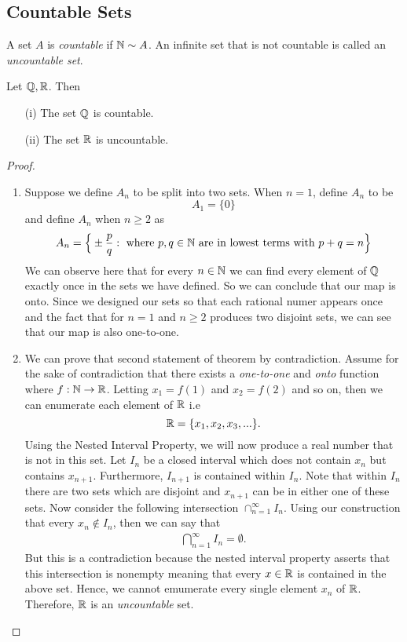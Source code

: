 \subsection{Countable Sets}

\begin{definition}
A set \( A \) is \textit{countable} if \( \mathbb{N} \sim A \). An infinite set that is not countable is called an \textit{uncountable set}.
\end{definition}

\begin{theorem}
Let \( \mathbb{Q}, \mathbb{R} \). Then 
\begin{enumerate}
    \item[(i)] The set \( \mathbb{Q} \) is countable. 
    \item[(ii)] The set \( \mathbb{R} \) is uncountable.
\end{enumerate}


\end{theorem} 


\begin{proof}
\begin{enumerate}
\item Suppose we define \( A_n \) to be split into two sets. When \( n = 1 \), define \( A_n \) to be 
\[ A_1 = \{  0 \}\] and define \( A_n \) when \( n \geq 2 \) as 
\[ A_n =   \Big\{ \pm \frac{p}{q} : \text{ where } p,q \in \mathbb{N} \text{ are in lowest terms with } p + q = n   \Big\}\]
We can observe here that for every \( n \in \mathbb{N} \) we can find every element of \( \mathbb{Q} \) exactly once in the sets we have defined. So we can conclude that our map is onto. Since we designed our sets so that each rational numer appears once and the fact that for \( n =1 \) and \( n \geq 2 \) produces two disjoint sets, we can see that our map is also one-to-one. 
\item We can prove that second statement of theorem by contradiction. Assume for the sake of contradiction that there exists a \textit{one-to-one} and \textit{onto} function where \( f: \mathbb{N} \to \mathbb{R} \). Letting \( x_1 = f(1)\) and \( x_2 = f(2)\) and so on, then we can enumerate each element of \( \mathbb{R} \) i.e 
    \[ \mathbb{R} = \{ x_1, x_2, x_3, ... \}.\]
    Using the Nested Interval Property, we will now produce a real number that is not in this set. Let \( I_n \) be a closed interval which does not contain  \( x_n \) but contains \( x_{n+1}\). Furthermore, \( I_{n+1}\) is contained within \( I_n \). Note that within \( I_n \) there are two sets which are disjoint and \( x_{n+1}\) can be in either one of these sets. Now consider the following intersection \( \cap_{n=1}^{\infty} I_n \). Using our construction that every \(x_n \not\in I_n \), then we can say that
    \begin{align*} \bigcap_{n=1 }^{\infty} I_n = \emptyset. \end{align*}
But this is a contradiction because the nested interval property asserts that this intersection is nonempty meaning that every \( x \in \mathbb{R} \) is contained in the above set. Hence, we cannot emumerate every single element \( x_n  \) of \( \mathbb{R} \). Therefore, \( \mathbb{R} \) is an \textit{uncountable} set.
\end{enumerate}
\end{proof}

